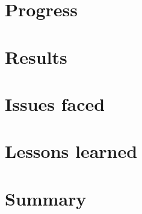 \documentclass[
pdftex,                %
a4paper,                 %
11pt,                     %
parskip=half,         %
headsepline,        %
]
{scrartcl}
\begin{document}
  

  \section{Progress}

  

  \section{Results}

  

  \section{Issues faced}

  \section{Lessons learned}

  
	
	\section{Summary}
	
	
	
	\renewcommand{\refname}{Literatur}
	\begin{thebibliography}{xxxx}
		
	\end{thebibliography}
	
\end{document}
